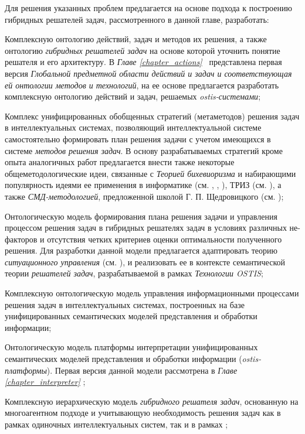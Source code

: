 Для решения указанных проблем предлагается на основе подхода к построению гибридных решателей задач, рассмотренного в данной главе, разработать:
\begin{textitemize}
	\item Комплексную онтологию действий, задач и методов их решения, а также онтологию \textit{гибридных решателей задач} на основе которой уточнить понятие решателя и его архитектуру. В \textit{Главе \ref{chapter_actions}~} представлена первая версия \textit{Глобальной предметной области действий и задач и соответствующая ей онтологии методов и технологий}, на ее основе предлагается разработать комплексную онтологию действий и задач, решаемых \textit{ostis-системами};
	\item Комплекс унифицированных обобщенных стратегий (метаметодов) решения задач в интеллектуальных системах, позволяющий интеллектуальной системе самостоятельно формировать план решения задачи с учетом имеющихся в системе \textit{методов решения задач}. В основу разрабатываемых стратегий кроме опыта аналогичных работ предлагается внести также некоторые общеметодологические идеи, связанные с \textit{Теорией бихевиоризма} и набирающими популярность идеями ее применения в информатике (см. , , ), ТРИЗ (см. ), а также \textit{СМД-методологией}, предложенной школой Г. П. Щедровицкого (см. );
	\item Онтологическую модель формирования плана решения задачи и управления процессом решения задач в гибридных решателях задач в условиях различных не-факторов и отсутствия четких критериев оценки оптимальности полученного решения. Для разработки данной модели предлагается адаптировать теорию \textit{ситуационного управления} (см. ), и реализовать ее в контексте семантической теории \textit{решателей задач}, разрабатываемой в рамках \textit{Технологии OSTIS};
	\item Комплексную онтологическую модель управления информационными процессами решения задач в интеллектуальных системах, построенных на базе унифицированных семантических моделей представления и обработки информации;
	\item Онтологическую модель платформы интерпретации унифицированных семантических моделей представления и обработки информации (\textit{ostis-платформы}). Первая версия данной модели рассмотрена в \textit{Главе \ref{chapter_interpreter} };
	\item Комплексную иерархическую модель \textit{гибридного решателя задач}, основанную на многоагентном подходе и учитывающую необходимость решения задач как в рамках одиночных интеллектуальных систем, так и в рамках   ;

\end{textitemize}
